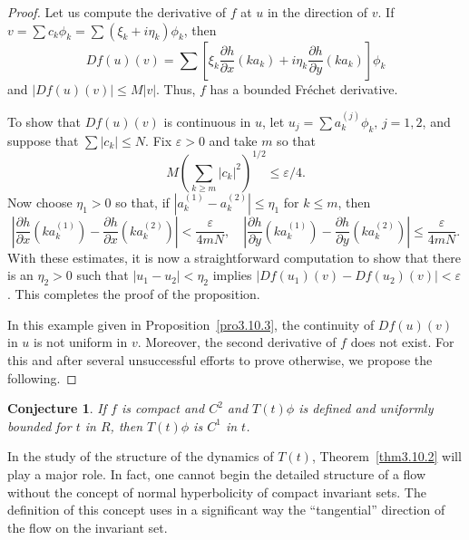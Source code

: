 \documentclass{surv-l}
\theoremstyle{plain}
\newtheorem*{conj}{Conjecture}
\theoremstyle{definition}
\numberwithin{equation}{section}
\numberwithin{figure}{chapter}
\begin{document}
\begin{proof}
Let us compute the derivative of $f$ at $u$ in the direction of $v$. If $v=\sum c_{k}\phi_{k}= \sum(\xi_{k}+i\eta_{k})\phi_{k}$, then
\begin{equation*}
Df(u)(v)=\sum\left[\xi_{k}\frac{\partial h}{\partial x}(ka_{k})+i\eta_{k}\frac{\partial h}{\partial y}(ka_{k})\right]\phi_{k}
\end{equation*}
and $|Df(u)(v)|\leq M|v|$. Thus, $f$ has a bounded Fr\'{e}chet derivative.

To show that $Df(u)(v)$ is continuous in $u$, let $u_{j}=\sum a_{k}^{(j)}\phi_{k},\, j=1,2$, and suppose that $\sum|c_{k}|\leq N$. Fix $\varepsilon >0$ and take $m$ so that
\begin{equation*}
M\left(\sum_{k\geq m}|c_{k}|^{2}\right)^{1/2}\leq\varepsilon/4.
\end{equation*}
Now choose $\eta_{1}>0$ so that, if $|a_{k}^{(1)}-a_{k}^{(2)}|\leq\eta_{1}$ for $k\leq m$, then
\begin{equation*}
\left|\frac{\partial h}{\partial x}(ka_{k}^{(1)})-\frac{\partial h}{\partial x}(ka_{k}^{(2)})\right|<\frac{\varepsilon}{4mN},\quad \left|\displaystyle \frac{\partial h}{\partial y}(ka_{k}^{(1)})-\frac{\partial h}{\partial y}(ka_{k}^{(2)})\right|\leq\frac{\varepsilon}{4mN}.
\end{equation*}
With these estimates, it is now a straightforward computation to show that there is an $\eta_{2}>0$ such that $|u_{1}-u_{2}|<\eta_{2}$ implies $|Df(u_{1})(v)-Df(u_{2})(v)|<\varepsilon$. This completes the proof of the proposition.

In this example given in Proposition~\ref{pro3.10.3}, the continuity of $Df(u)(v)$ in $u$ is not uniform in $v$. Moreover, the second derivative of $f$ does not exist. For this and after several unsuccessful efforts to prove otherwise, we propose the following.
\end{proof}

\begin{conj} If $f$ is compact and $C^{2}$ and $ T(t)\phi$ is defined and uniformly bounded for $t$ in $R$, then $ T(t)\phi$ is $C^{1}$ in $t$.
\end{conj}

In the study of the structure of the dynamics of $T(t)$, Theorem~\ref{thm3.10.2} will play a major role. In fact, one cannot begin the detailed structure of a flow without the concept of normal hyperbolicity of compact invariant sets. The definition of this concept uses in a significant way the ``tangential'' direction of the flow on the invariant set.
\end{document}
